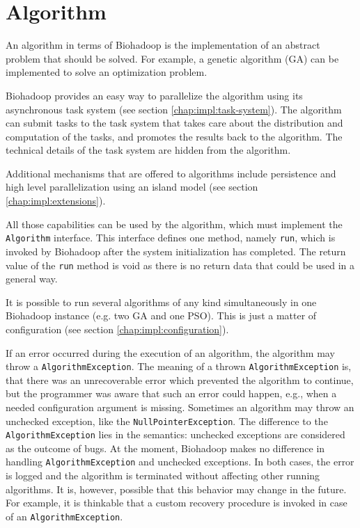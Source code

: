 \section{Algorithm}
\label{chap:impl:algorithm}
An algorithm in terms of Biohadoop is the implementation of an abstract problem that should be solved. For example, a genetic algorithm (GA) can be implemented to solve an optimization problem.

Biohadoop provides an easy way to parallelize the algorithm using its asynchronous task system (see section \ref{chap:impl:task-system}). The algorithm can submit tasks to the task system that takes care about the distribution and computation of the tasks, and promotes the results back to the algorithm. The technical details of the task system are hidden from the algorithm.

Additional mechanisms that are offered to algorithms include persistence and high level parallelization using an island model (see section \ref{chap:impl:extensions}).

All those capabilities can be used by the algorithm, which must implement the \texttt{Algorithm} interface. This interface defines one method, namely \texttt{run}, which is invoked by Biohadoop after the system initialization has completed. The return value of the \texttt{run} method is void as there is no return data that could be used in a general way.

It is possible to run several algorithms of any kind simultaneously in one Biohadoop instance (e.g. two GA and one PSO). This is just a matter of configuration (see section \ref{chap:impl:configuration}).
   
If an error occurred during the execution of an algorithm, the algorithm may throw a \texttt{AlgorithmException}. The meaning of a thrown \texttt{AlgorithmException} is, that there was an unrecoverable error which prevented the algorithm to continue, but the programmer was aware that such an error could happen, e.g., when a needed configuration argument is missing. Sometimes an algorithm may throw an unchecked exception, like the \texttt{NullPointerException}. The difference to the \texttt{AlgorithmException} lies in the semantics: unchecked exceptions are considered as the outcome of bugs. At the moment, Biohadoop makes no difference in handling \texttt{AlgorithmException} and unchecked exceptions. In both cases, the error is logged and the algorithm is terminated without affecting other running algorithms. It is, however, possible that this behavior may change in the future. For example, it is thinkable that a custom recovery procedure is invoked in case of an \texttt{AlgorithmException}.

